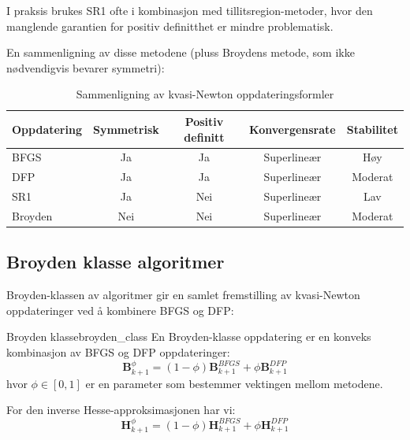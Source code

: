 I praksis brukes SR1 ofte i kombinasjon med tillitsregion-metoder, hvor den manglende garantien for positiv definitthet er mindre problematisk.

En sammenligning av disse metodene (pluss Broydens metode, som ikke nødvendigvis bevarer symmetri):

\begin{table}[H]
	\centering
	\begin{tabular}{|l|c|c|c|c|}
		\hline
		\textbf{Oppdatering} & \textbf{Symmetrisk} & \textbf{Positiv definitt} & \textbf{Konvergensrate} & \textbf{Stabilitet} \\ \hline
		BFGS                 & Ja                  & Ja                        & Superlineær             & Høy                 \\ \hline
		DFP                  & Ja                  & Ja                        & Superlineær             & Moderat             \\ \hline
		SR1                  & Ja                  & Nei                       & Superlineær             & Lav                 \\ \hline
		Broyden              & Nei                 & Nei                       & Superlineær             & Moderat             \\ \hline
	\end{tabular}
	\caption{Sammenligning av kvasi-Newton oppdateringsformler}
	\label{tab:quasi_newton_comparison}
\end{table}

\subsection{Broyden klasse algoritmer}
\label{subsec:broyden_class}

Broyden-klassen av algoritmer gir en samlet fremstilling av kvasi-Newton oppdateringer ved å kombinere BFGS og DFP:

\begin{definition}{Broyden klasse}{broyden_class}
	En Broyden-klasse oppdatering er en konveks kombinasjon av BFGS og DFP oppdateringer:
	\[
		\symbf{B}_{k+1}^\phi = (1-\phi)\symbf{B}_{k+1}^{BFGS} + \phi\symbf{B}_{k+1}^{DFP}
	\]
	hvor $\phi \in [0,1]$ er en parameter som bestemmer vektingen mellom metodene.
\end{definition}

For den inverse Hesse-approksimasjonen har vi:
\[
	\symbf{H}_{k+1}^\phi = (1-\phi)\symbf{H}_{k+1}^{BFGS} + \phi\symbf{H}_{k+1}^{DFP}
\]

